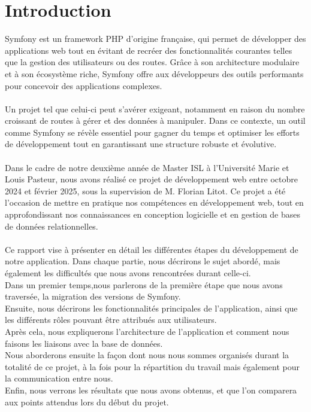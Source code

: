 \documentclass[12pt]{article}
\begin{document}
    \section{Introduction}
    Symfony est un framework PHP d’origine française, qui permet de développer des applications web tout en évitant de recréer des fonctionnalités courantes telles que la gestion des utilisateurs ou des routes. Grâce à son architecture modulaire et à son écosystème riche, Symfony offre aux développeurs des outils performants pour concevoir des applications complexes.
    \\
    \\
    Un projet tel que celui-ci peut s’avérer exigeant, notamment en raison du nombre croissant de routes à gérer et des données à manipuler. Dans ce contexte, un outil comme Symfony se révèle essentiel pour gagner du temps et optimiser les efforts de développement tout en garantissant une structure robuste et évolutive.
    \\
    \\
    Dans le cadre de notre deuxième année de Master ISL à l’Université Marie et Louis Pasteur, nous avons réalisé ce projet de développement web entre octobre 2024 et février 2025, sous la supervision de M. Florian Litot. Ce projet a été l’occasion de mettre en pratique nos compétences en développement web, tout en approfondissant nos connaissances en conception logicielle et en gestion de bases de données relationnelles.
    \\
    \\
    Ce rapport vise à présenter en détail les différentes étapes du développement de notre application. Dans chaque partie, nous décrirons le sujet abordé, mais également les difficultés que nous avons rencontrées durant celle-ci.
    \\
    Dans un premier temps,nous parlerons de la première étape que nous avons traversée, la migration des versions de Symfony.
    \\
    Ensuite, nous décrirons les fonctionnalités principales de l'application, ainsi que les différents rôles pouvant être attribués aux utilisateurs.
    \\
    Après cela, nous expliquerons l'architecture de l'application et comment nous faisons les liaisons avec la base de données.
    \\
    Nous aborderons ensuite la façon dont nous nous sommes organisés durant la totalité de ce projet, à la fois pour la répartition du travail mais également pour la communication entre nous.
    \\
    Enfin, nous verrons les résultats que nous avons obtenus, et que l'on comparera aux points attendus lors du début du projet.
\end{document}
